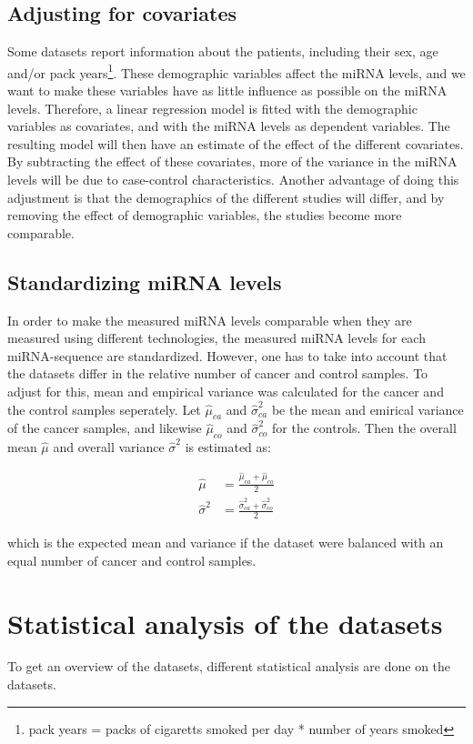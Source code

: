 \subsection{Adjusting for covariates}
Some datasets report information about the patients, including their sex, age and/or pack years\footnote{pack years = packs of cigaretts smoked per day * number of years smoked}. These demographic variables affect the miRNA levels, and we want to make these variables have as little influence as possible on the miRNA levels. Therefore, a linear regression model is fitted with the demographic variables as covariates, and with the miRNA levels as dependent variables. The resulting model will then have an estimate of the effect of the different covariates. By subtracting the effect of these covariates, more of the variance in the miRNA levels will be due to case-control characteristics. Another advantage of doing this adjustment is that the demographics of the different studies will differ, and by removing the effect of demographic variables, the studies become more comparable.


\subsection{Standardizing miRNA levels}
In order to make the measured miRNA levels comparable when they are measured using different technologies, the measured miRNA levels for each miRNA-sequence are standardized. However, one has to take into account that the datasets differ in the relative number of cancer and control samples. To adjust for this, mean and empirical variance was calculated for the cancer and the control samples seperately. Let $\hat{\mu}_{ca}$ and $\hat{\sigma}_{ca}^2$ be the mean and emirical variance of the cancer samples, and likewise $\hat{\mu}_{co}$ and $\hat{\sigma}_{co}^2$ for the controls. Then the overall mean $\hat{\mu}$ and overall variance $\hat{\sigma}^2$ is estimated as:

\begin{align*}
	\hat{\mu} & = \frac{\hat{\mu}_{ca} + \hat{\mu}_{co}}{2} \\
	\hat{\sigma}^2 &= \frac{\hat{\sigma}_{ca}^2 + \hat{\sigma}_{co}^2}{2}
\end{align*}

which is the expected mean and variance if the dataset were balanced with an equal number of cancer and control samples.

\section{Statistical analysis of the datasets}
To get an overview of the datasets, different statistical analysis are done on the datasets.

